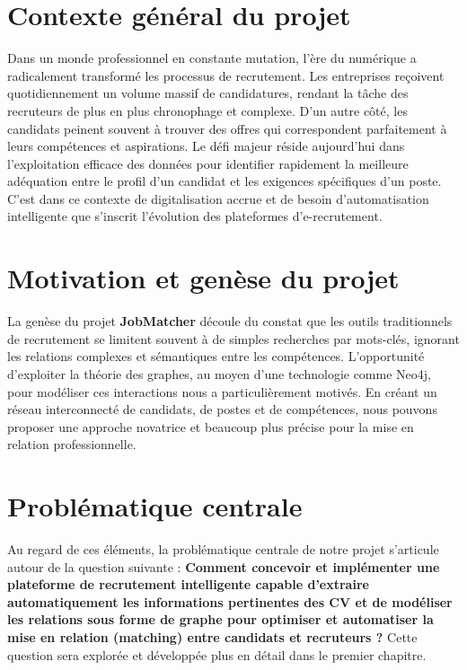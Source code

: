 \documentclass[12pt,a4paper]{report}
\begin{document}
\section*{Contexte général du projet}
Dans un monde professionnel en constante mutation, l'ère du numérique a radicalement transformé les processus de recrutement. Les entreprises reçoivent quotidiennement un volume massif de candidatures, rendant la tâche des recruteurs de plus en plus chronophage et complexe. D'un autre côté, les candidats peinent souvent à trouver des offres qui correspondent parfaitement à leurs compétences et aspirations. Le défi majeur réside aujourd'hui dans l'exploitation efficace des données pour identifier rapidement la meilleure adéquation entre le profil d'un candidat et les exigences spécifiques d'un poste. C'est dans ce contexte de digitalisation accrue et de besoin d'automatisation intelligente que s'inscrit l'évolution des plateformes d'e-recrutement.

\section*{Motivation et genèse du projet}
La genèse du projet \textbf{JobMatcher} découle du constat que les outils traditionnels de recrutement se limitent souvent à de simples recherches par mots-clés, ignorant les relations complexes et sémantiques entre les compétences. L'opportunité d'exploiter la théorie des graphes, au moyen d'une technologie comme Neo4j, pour modéliser ces interactions nous a particulièrement motivés. En créant un réseau interconnecté de candidats, de postes et de compétences, nous pouvons proposer une approche novatrice et beaucoup plus précise pour la mise en relation professionnelle.

\section*{Problématique centrale}
Au regard de ces éléments, la problématique centrale de notre projet s'articule autour de la question suivante : \textbf{Comment concevoir et implémenter une plateforme de recrutement intelligente capable d'extraire automatiquement les informations pertinentes des CV et de modéliser les relations sous forme de graphe pour optimiser et automatiser la mise en relation (matching) entre candidats et recruteurs ?} 
Cette question sera explorée et développée plus en détail dans le premier chapitre.
\end{document}
